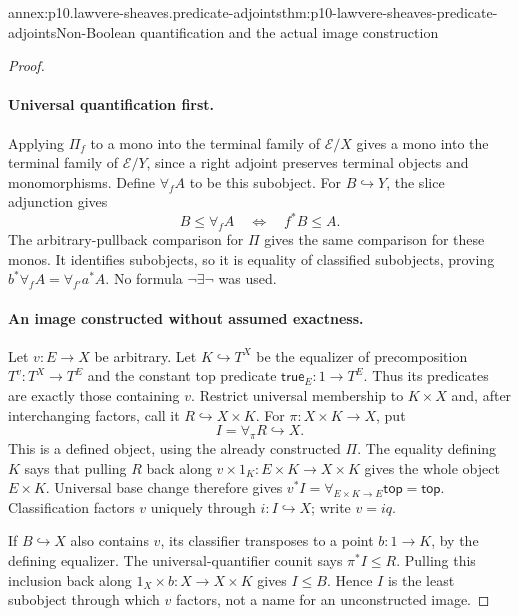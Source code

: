\begin{annexitem}{annex:p10.lawvere-sheaves.predicate-adjoints}{thm:p10-lawvere-sheaves-predicate-adjoints}{Non-Boolean quantification and the actual image construction}
\begin{proof}
\paragraph{Universal quantification first.}
Applying \(\Pi_f\) to a mono into the terminal family of
\(\mathcal E/X\) gives a mono into the terminal family
of \(\mathcal E/Y\), since a right adjoint preserves
terminal objects and monomorphisms.  Define \(\forall_fA\)
to be this subobject.  For \(B\hookrightarrow Y\), the
slice adjunction gives
\[
        B\leq\forall_fA\quad\Longleftrightarrow\quad
                                           f^*B\leq A.
\]
The arbitrary-pullback comparison for \(\Pi\) gives the
same comparison for these monos.  It identifies subobjects,
so it is equality of classified subobjects, proving
\(b^*\forall_fA=\forall_{f'}a^*A\).
No formula \(\neg\exists\neg\) was used.

\paragraph{An image constructed without assumed exactness.}
Let \(v:E\to X\) be arbitrary.  Let \(K\hookrightarrow T^X\)
be the equalizer of precomposition \(T^v:T^X\to T^E\)
and the constant top predicate \(\mathsf{true}_E:1\to T^E\).
Thus its predicates are exactly those containing \(v\).
Restrict universal membership to \(K\times X\) and,
after interchanging factors, call it
\(R\hookrightarrow X\times K\).  For
\(\pi:X\times K\to X\), put
\[
                         I=\forall_\pi R\hookrightarrow X.
\]
This is a defined object, using the already constructed \(\Pi\).
The equality defining \(K\) says that pulling \(R\) back
along \(v\times1_K:E\times K\to X\times K\) gives
the whole object \(E\times K\).  Universal base change
therefore gives \(v^*I=\forall_{E\times K\to E}\mathsf{top}
=\mathsf{top}\).  Classification factors \(v\) uniquely
through \(i:I\hookrightarrow X\); write \(v=iq\).

If \(B\hookrightarrow X\) also contains \(v\), its
classifier transposes to a point \(b:1\to K\), by the
defining equalizer.  The universal-quantifier counit says
\(\pi^*I\leq R\).  Pulling this inclusion back along
\(1_X\times b:X\to X\times K\) gives \(I\leq B\).
Hence \(I\) is the least subobject through which \(v\)
factors, not a name for an unconstructed image.


\end{proof}
\end{annexitem}
